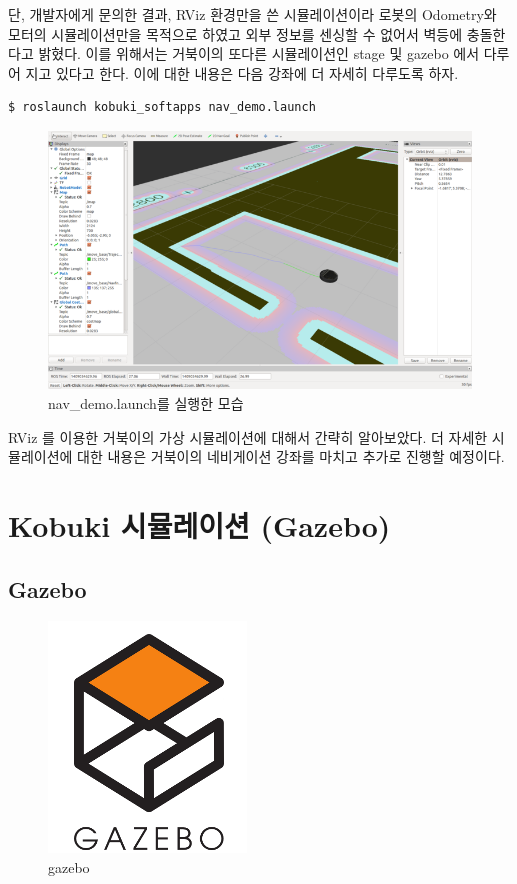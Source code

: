 단, 개발자에게 문의한 결과, RViz 환경만을 쓴 시뮬레이션이라 로봇의 Odometry와 모터의 시뮬레이션만을 목적으로 하였고 외부 정보를 센싱할 수 없어서 벽등에 충돌한다고 밝혔다. 이를 위해서는 거북이의 또다른 시뮬레이션인 stage 및 gazebo 에서 다루어 지고 있다고 한다. 이에 대한 내용은 다음 강좌에 더 자세히 다루도록 하자.

\vspace{\baselineskip}
\begin{lstlisting}[language=ROS]
$ roslaunch kobuki_softapps nav_demo.launch
\end{lstlisting}

\begin{figure}[h]
\centering\includegraphics[width=\columnwidth]{pictures/chapter10/nav_demo.png}
\caption{nav\_demo.launch를 실행한 모습}
\end{figure}

RViz 를 이용한 거북이의 가상 시뮬레이션에 대해서 간략히 알아보았다. 더 자세한 시뮬레이션에 대한 내용은 거북이의 네비게이션 강좌를 마치고 추가로 진행할 예정이다.

\newpage
\section{Kobuki 시뮬레이션 (Gazebo)}

\subsection{Gazebo}

\begin{figure}[h]
\centering\includegraphics[width=0.3\columnwidth]{pictures/chapter10/gazebo.png}
\caption{gazebo}
\end{figure}

